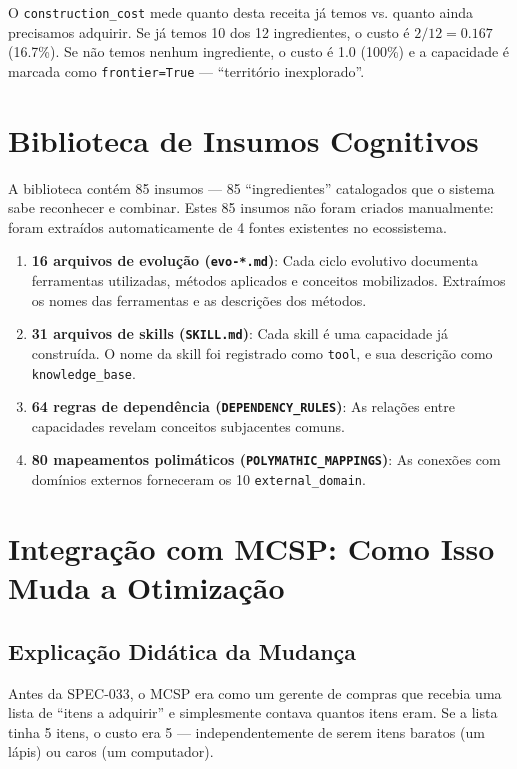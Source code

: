 O \texttt{construction\_cost} mede quanto desta receita já temos vs. quanto ainda precisamos adquirir. Se já temos 10 dos 12 ingredientes, o custo é $2/12 = 0.167$ (16.7\%). Se não temos nenhum ingrediente, o custo é 1.0 (100\%) e a capacidade é marcada como \texttt{frontier=True} — ``território inexplorado''.

\section{Biblioteca de Insumos Cognitivos}

A biblioteca contém 85 insumos — 85 ``ingredientes'' catalogados que o sistema sabe reconhecer e combinar. Estes 85 insumos não foram criados manualmente: foram extraídos automaticamente de 4 fontes existentes no ecossistema.

\begin{enumerate}
    \item \textbf{16 arquivos de evolução (\texttt{evo-*.md})}: Cada ciclo evolutivo documenta ferramentas utilizadas, métodos aplicados e conceitos mobilizados. Extraímos os nomes das ferramentas e as descrições dos métodos.
    \item \textbf{31 arquivos de skills (\texttt{SKILL.md})}: Cada skill é uma capacidade já construída. O nome da skill foi registrado como \texttt{tool}, e sua descrição como \texttt{knowledge\_base}.
    \item \textbf{64 regras de dependência (\texttt{DEPENDENCY\_RULES})}: As relações entre capacidades revelam conceitos subjacentes comuns.
    \item \textbf{80 mapeamentos polimáticos (\texttt{POLYMATHIC\_MAPPINGS})}: As conexões com domínios externos forneceram os 10 \texttt{external\_domain}.
\end{enumerate}

\section{Integração com MCSP: Como Isso Muda a Otimização}

\subsection{Explicação Didática da Mudança}

Antes da SPEC-033, o MCSP era como um gerente de compras que recebia uma lista de ``itens a adquirir'' e simplesmente contava quantos itens eram. Se a lista tinha 5 itens, o custo era 5 — independentemente de serem itens baratos (um lápis) ou caros (um computador).


